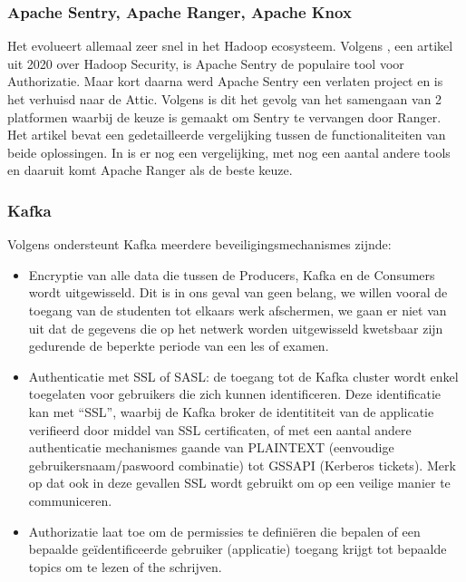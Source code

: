 \subsubsection{Apache Sentry, Apache Ranger, Apache Knox}
Het evolueert allemaal zeer snel in het Hadoop ecosysteem. Volgens \textcite{Chu2020}, een artikel uit 2020 over Hadoop Security, is Apache Sentry de populaire tool voor Authorizatie. Maar kort daarna werd Apache Sentry een verlaten project en is het verhuisd naar de Attic.
\newline
Volgens \textcite{Anand2021} is dit het gevolg van het samengaan van 2 platformen waarbij de keuze is gemaakt om Sentry te vervangen door Ranger. Het artikel bevat een gedetailleerde vergelijking tussen de functionaliteiten van beide oplossingen.
\newline
In \textcite{Soo2020} is er nog een vergelijking, met nog een aantal andere tools en daaruit komt Apache Ranger als de beste keuze.


\subsubsection {Kafka}
Volgens \textcite{Maarek2018} ondersteunt Kafka meerdere beveiligingsmechanismes zijnde:
\begin{itemize}
    \item Encryptie van alle data die tussen de Producers, Kafka en de Consumers wordt uitgewisseld. Dit is in ons geval van geen belang, we willen vooral de toegang van de studenten tot elkaars werk afschermen, we gaan er niet van uit dat de gegevens die op het netwerk worden uitgewisseld kwetsbaar zijn gedurende de beperkte periode van een les of examen.
    \item Authenticatie met SSL of SASL: de toegang tot de Kafka cluster wordt enkel toegelaten voor gebruikers die zich kunnen identificeren. Deze identificatie kan met ``SSL'', waarbij de Kafka broker de identititeit van de applicatie verifieerd door middel van SSL certificaten, of met een aantal andere authenticatie mechanismes gaande van PLAINTEXT (eenvoudige gebruikersnaam/paswoord combinatie) tot GSSAPI (Kerberos tickets). Merk op dat ook in deze gevallen SSL wordt gebruikt om op een veilige manier te communiceren.
    \item Authorizatie laat toe om de permissies te definiëren die bepalen of een bepaalde geïdentificeerde gebruiker (applicatie) toegang krijgt tot bepaalde topics om te lezen of the schrijven.
\end{itemize}

